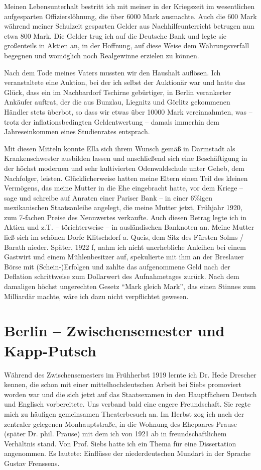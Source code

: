 Meinen Lebensunterhalt bestritt ich mit meiner in der Kriegszeit im wesentlichen aufgesparten Offizierslöhnung, die über \num{6000} Mark ausmachte. Auch die 600 Mark während meiner Schulzeit gesparten Gelder aus Nachhilfeunterricht betrugen nun etwa 800 Mark. Die Gelder trug ich auf die Deutsche Bank und legte sie großenteils in Aktien an, in der Hoffnung, auf diese Weise dem Währungsverfall begegnen und womöglich noch Realgewinne erzielen zu können.

Nach dem Tode meines Vaters mussten wir den Haushalt auflösen. Ich veranstaltete eine Auktion, bei der ich selbst der Auktionär war und hatte das Glück, dass ein im Nachbardorf Tschirne gebürtiger, in Berlin verankerter Ankäufer auftrat, der die aus Bunzlau, Liegnitz und Görlitz gekommenen Händler stets überbot, so dass wir etwas über \num{10000} Mark vereinnahmten, was -- trotz der inflationsbedingten Geldentwertung -- damals immerhin dem Jahreseinkommen eines Studienrates entsprach. 

Mit diesen Mitteln konnte Ella sich ihrem Wunsch gemäß in Darmstadt als Krankenschwester ausbilden lassen und anschließend sich eine Beschäftigung in der höchst modernen und sehr kultivierten Odenwaldschule unter Geheb, dem Nachfolger, leisten. Glücklicherweise hatten meine Eltern einen Teil des kleinen Vermögens, das meine Mutter in die Ehe eingebracht hatte, vor dem Kriege -- sage und schreibe auf Anraten einer Pariser Bank -- in einer 6\%igen mexikanischen Staatsanleihe angelegt, die meine Mutter jetzt, Frühjahr 1920, zum 7-fachen Preise des Nennwertes verkaufte. Auch diesen Betrag legte ich in Aktien und z.T. -- törichterweise -- in ausländischen Banknoten an. Meine Mutter ließ sich im schönen Dorfe Klitschdorf a. Queis, dem Sitz des Fürsten Solms / Barath nieder. Später, 1922 f, nahm ich nicht unerhebliche Anleihen bei einem Gastwirt und einem Mühlenbesitzer auf, spekulierte mit ihm an der Breslauer Börse mit (Schein-)Erfolgen und zahlte das aufgenommene Geld nach der Deflation schrittweise zum Dollarwert des Aufnahmetages zurück. Nach dem damaligen höchst ungerechten Gesetz \enquote{Mark gleich Mark}, das einen Stinnes zum Milliardär machte, wäre ich dazu nicht verpflichtet gewesen.

\section{Berlin -- Zwischensemester und Kapp-Putsch}
Während des Zwischensemesters im Frühherbst 1919 lernte ich Dr. Hede Drescher kennen, die schon mit einer mittelhochdeutschen Arbeit bei Siebs promoviert worden war und die sich jetzt auf das Staatsexamen in den Hauptfächern Deutsch und Englisch vorbereitete. Uns verband bald eine engere Freundschaft. Sie regte mich zu häufigen gemeinsamen Theaterbesuch an. Im Herbst zog ich nach der zentraler gelegenen Monhauptstraße, in die Wohnung des Ehepaares Prause (später Dr. phil. Prause) mit dem ich von 1921 ab in freundschaftlichem Verhältnis stand. Von Prof. Siebs hatte ich ein Thema für eine Dissertation angenommen. Es lautete: Einflüsse der niederdeutschen Mundart in der Sprache Gustav Frenssens.

